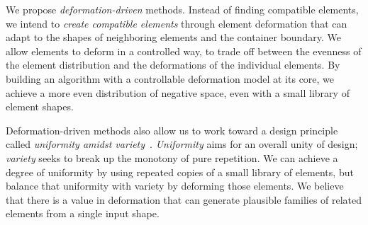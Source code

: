
We propose \textit{deformation-driven} methods.
Instead of finding compatible elements,
we intend to \textit{create compatible elements} through element deformation
that can adapt to the shapes of neighboring elements and the container boundary.
We allow elements to deform in a controlled way,
to trade off between the evenness of the element distribution and 
the deformations of the individual elements.
By building an algorithm with a controllable deformation model at its core, we achieve a
more even distribution of negative space, even with a small library of element shapes.

Deformation-driven methods also allow us to work toward a design principle called \textit{uniformity amidst variety}~\cite{Hutcheson1729, Gombrich}. 
\textit{Uniformity} aims for an overall unity of design; 
\textit{variety} seeks to break up the monotony of
pure repetition.
We can achieve a degree of uniformity by using repeated copies of a small library of elements, but balance that uniformity with
variety by deforming those elements. 
We believe that there is a value in deformation that can generate plausible families of related elements from a single input shape.

